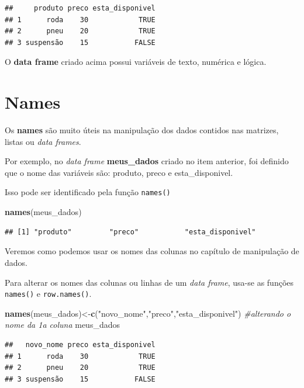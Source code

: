 \documentclass[
]{book}
\newenvironment{Shaded}{\begin{snugshade}}{\end{snugshade}}
\newcommand{\CommentTok}[1]{\textcolor[rgb]{0.56,0.35,0.01}{\textit{#1}}}
\newcommand{\KeywordTok}[1]{\textcolor[rgb]{0.13,0.29,0.53}{\textbf{#1}}}
\newcommand{\NormalTok}[1]{#1}
\newcommand{\StringTok}[1]{\textcolor[rgb]{0.31,0.60,0.02}{#1}}
\begin{document}
\begin{verbatim}
##     produto preco esta_disponivel
## 1      roda    30            TRUE
## 2      pneu    20            TRUE
## 3 suspensão    15           FALSE
\end{verbatim}

O \textbf{data frame} criado acima possui variáveis de texto, numérica e
lógica.

\hypertarget{names}{%
\section{Names}\label{names}}

Os \textbf{names} são muito úteis na manipulação dos dados contidos nas
matrizes, listas ou \emph{data frames}.

Por exemplo, no \emph{data frame} \textbf{meus\_dados} criado no item
anterior, foi definido que o nome das variáveis são: produto, preco e
esta\_disponivel.

Isso pode ser identificado pela função \texttt{names()}

\begin{Shaded}
\begin{Highlighting}[]
\KeywordTok{names}\NormalTok{(meus_dados)}
\end{Highlighting}
\end{Shaded}

\begin{verbatim}
## [1] "produto"         "preco"           "esta_disponivel"
\end{verbatim}

Veremos como podemos usar os nomes das colunas no capítulo de
manipulação de dados.

Para alterar os nomes das colunas ou linhas de um \emph{data frame},
usa-se as funções \texttt{names()} e \texttt{row.names()}.

\begin{Shaded}
\begin{Highlighting}[]
\KeywordTok{names}\NormalTok{(meus_dados)<-}\KeywordTok{c}\NormalTok{(}\StringTok{"novo_nome"}\NormalTok{,}\StringTok{"preco"}\NormalTok{,}\StringTok{"esta_disponivel"}\NormalTok{) }\CommentTok{#alterando o nome da 1a coluna}
\NormalTok{meus_dados}
\end{Highlighting}
\end{Shaded}

\begin{verbatim}
##   novo_nome preco esta_disponivel
## 1      roda    30            TRUE
## 2      pneu    20            TRUE
## 3 suspensão    15           FALSE
\end{verbatim}
\end{document}
